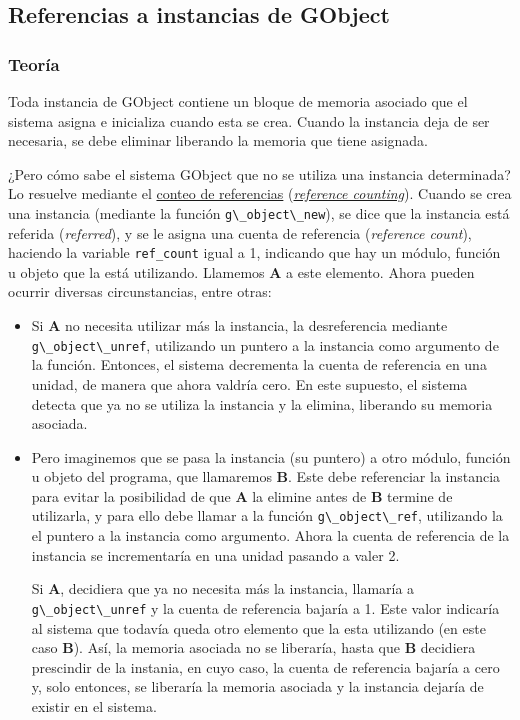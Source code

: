 \subsection{Referencias a instancias de \textsf{GObject}} \label{subsec:ref_instancias_gobject}
\subsubsection{Teoría}
Toda instancia de \textsf{GObject} contiene un bloque de memoria asociado que el sistema asigna e inicializa
cuando esta se crea.
Cuando la instancia deja de ser necesaria, se debe eliminar liberando la memoria que tiene asignada.

¿Pero cómo sabe el sistema \textsf{GObject}  que no se utiliza una instancia determinada?
Lo resuelve mediante el
\href{https://es.wikipedia.org/wiki/Conteo_de_referencias}{conteo de referencias}
(\href{https://en.wikipedia.org/wiki/Reference_counting}{\textit{reference counting}}).
Cuando se crea una instancia (mediante la función \passthrough{\lstinline!g\_object\_new!}), se dice que
la instancia está referida (\emph{referred}), y se le asigna una cuenta de referencia (\textit{reference count}), haciendo la variable \texttt{ref\_count} igual a 1, indicando que hay un módulo, función u objeto que la está utilizando. Llamemos \textbf{A} a este elemento.
Ahora pueden ocurrir diversas circunstancias, entre otras:
\begin{itemize}
  \tightlist
\item Si \textbf{A} no necesita utilizar más la instancia, la desreferencia mediante \passthrough{\lstinline!g\_object\_unref!}, utilizando un puntero a la instancia como argumento de la función.
  Entonces, el sistema decrementa la cuenta de referencia en una unidad, de manera que ahora valdría cero.
  En este supuesto, el sistema detecta que ya no se utiliza la instancia y la elimina, liberando su memoria asociada.
  \item Pero imaginemos que se pasa la instancia (su puntero) a otro módulo, función u objeto del programa,
    que llamaremos \textbf{B}. Este debe referenciar la instancia para evitar la posibilidad de que \textbf{A} la
    elimine antes de \textbf{B} termine de utilizarla, y para ello debe llamar a la función
    \passthrough{\lstinline!g\_object\_ref!}, utilizando la el puntero a la instancia como argumento.
    Ahora la cuenta de referencia de la instancia se incrementaría en una unidad pasando a valer 2.

    Si \textbf{A}, decidiera que ya no necesita más la instancia, llamaría a
    \passthrough{\lstinline!g\_object\_unref!} y la cuenta de referencia bajaría a 1. Este valor indicaría al sistema
    que todavía queda otro elemento que la esta utilizando (en este caso \textbf{B}). Así,
    la memoria asociada no se liberaría, hasta que \textbf{B} decidiera prescindir de la instania, en cuyo caso,
    la cuenta de referencia bajaría a cero y, solo entonces, se liberaría la memoria asociada y la instancia dejaría de
    existir en el sistema.
  \end{itemize}

